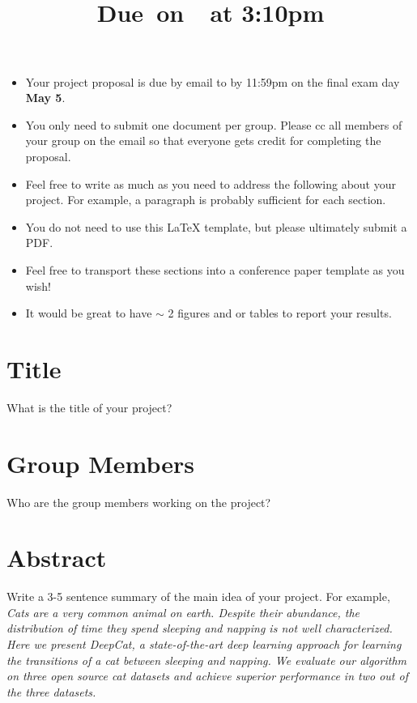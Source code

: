 \documentclass{article}
\title{
    \vspace{2in}
    \textmd{\textbf{\hmwkClass\hmwkTitle}}\\
    \normalsize\vspace{0.1in}\small{Due\ on\ \hmwkDueDate\ at 3:10pm}\\
    \vspace{3in}
}
\author{\hmwkAuthorName}
\date{}
\begin{document}

\begin{itemize}
\item Your project proposal is due by email to  by 11:59pm on the final exam day {\bf May 5}. 
\item You only need to submit one document per group. Please cc all members of your group on the email so that everyone gets credit for completing the proposal.  
\item Feel free to write as much as you need to address the following about your project. For example, a paragraph is probably sufficient for each section. 
\item You do not need to use this LaTeX template, but please ultimately submit a PDF. 
\item Feel free to transport these sections into a conference paper template as you wish!
\item It would be great to have $\sim$ 2 figures and or tables to report your results. 
\end{itemize}

\section{Title}

What is the title of your project?

\section{Group Members}

Who are the group members working on the project? 

\section{Abstract}

Write a 3-5 sentence summary of the main idea of your project. For example, \\

\emph{Cats are a very common animal on earth. Despite their abundance, the distribution of time they spend sleeping and napping is not well characterized. Here we present DeepCat, a state-of-the-art deep learning approach for learning the transitions of a cat between sleeping and napping. We evaluate our algorithm on three open source cat datasets and achieve superior performance in two out of the three datasets.}
\end{document}
